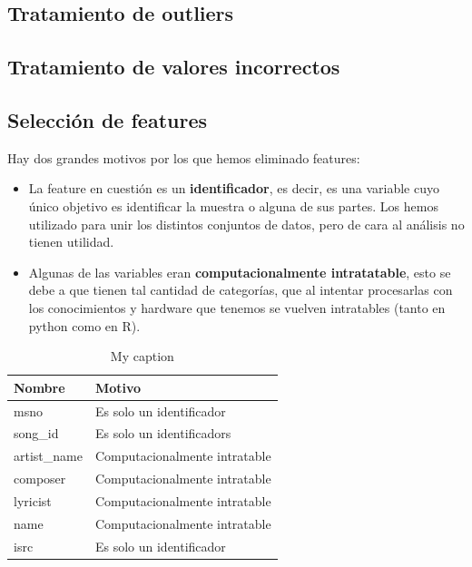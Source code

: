 \documentclass[a4paper]{article}
\begin{document}
\subsection{Tratamiento de outliers}

\subsection{Tratamiento de valores incorrectos}

\subsection{Selección de features}
Hay dos grandes motivos por los que hemos eliminado features: 

\begin{itemize}
\item La feature en cuestión es un \textbf{identificador}, es decir, es una variable cuyo único objetivo es identificar la muestra o alguna de sus partes. Los hemos utilizado para unir los distintos conjuntos de datos, pero de cara al análisis no tienen utilidad.
\item Algunas de las variables eran \textbf{computacionalmente intratatable}, esto se debe a que tienen tal cantidad de categorías, que al intentar procesarlas con los conocimientos y hardware que tenemos se vuelven intratables (tanto en python como en R).
\end{itemize}

\begin{table}[H]
\centering
\caption{My caption}
\label{my-label}
\begin{tabular}{|l|l|}
\hline
Nombre                   & Motivo \\ \hline
msno                     & Es solo un identificador \\ \hline
song\_id                 & Es solo un identificadors \\ \hline
artist\_name             & Computacionalmente intratable \\ \hline
composer                 & Computacionalmente intratable \\ \hline
lyricist                 & Computacionalmente intratable    \\ \hline
name                     & Computacionalmente intratable     \\ \hline
isrc                     & Es solo un identificador    \\ \hline
\end{tabular}
\end{table}
\end{document}
